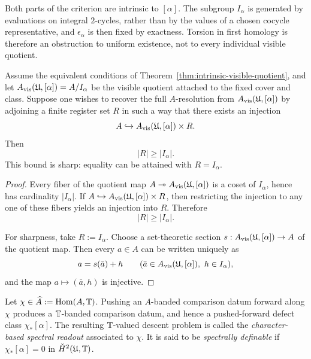 \begin{remark}\label{rem:cocycle-vs-pointwise}
Both parts of the criterion are intrinsic to $[\alpha]$.  The subgroup
$I_\alpha$ is generated by evaluations on integral $2$-cycles, rather than by
the values of a chosen cocycle representative, and
$\epsilon_\alpha$ is then fixed by exactness.  Torsion in first homology is
therefore an obstruction to uniform existence, not to every individual
visible quotient.
\end{remark}

\begin{lemma}
\label{thm:prefix-site-register-lower-bound}
Assume the equivalent conditions of
Theorem~\ref{thm:intrinsic-visible-quotient}, and let
$A_{\mathrm{vis}}(\mathfrak{U},[\alpha])=A/I_\alpha$ be the visible quotient attached to the fixed cover and
class.  Suppose one wishes to recover
the full $A$-resolution from $A_{\mathrm{vis}}(\mathfrak{U},[\alpha])$ by adjoining a finite register set $R$ in
such a way that there exists an injection
\[
A\hookrightarrow A_{\mathrm{vis}}(\mathfrak{U},[\alpha])\times R.
\]
Then
\[
\lvert R\rvert \ge \lvert I_\alpha\rvert.
\]
This bound is sharp: equality can be attained with $R=I_\alpha$.
\end{lemma}

\begin{proof}
Every fiber of the quotient map $A\twoheadrightarrow A_{\mathrm{vis}}(\mathfrak{U},[\alpha])$ is a coset of
$I_\alpha$, hence has cardinality $\lvert I_\alpha\rvert$.  If
$A\hookrightarrow A_{\mathrm{vis}}(\mathfrak{U},[\alpha])\times R$, then restricting the injection to any one of
these fibers yields an injection into $R$.  Therefore
\[
\lvert R\rvert\ge \lvert I_\alpha\rvert.
\]

For sharpness, take $R:=I_\alpha$.  Choose a set-theoretic section
$s:A_{\mathrm{vis}}(\mathfrak{U},[\alpha])\to A$ of the quotient map.  Then every $a\in A$ can be written
uniquely as
\[
a = s(\bar a)+h
\qquad
(\bar a\in A_{\mathrm{vis}}(\mathfrak{U},[\alpha]),\ h\in I_\alpha),
\]
and the map $a\mapsto (\bar a,h)$ is injective.
\end{proof}

\begin{definition}
\label{def:character-based-spectral-readout}
Let $\chi\in \widehat A:=\operatorname{Hom}(A,\mathbb{T})$.  Pushing an $A$-banded comparison datum
forward along $\chi$ produces a $\mathbb{T}$-banded comparison datum, and hence a
pushed-forward defect class $\chi_*[\alpha]$.  The resulting $\mathbb{T}$-valued
descent problem is called the \emph{character-based spectral readout}
associated to $\chi$.  It is said to be \emph{spectrally definable} if
$\chi_*[\alpha]=0$ in
$\check{H}^2(\mathfrak{U},\mathbb{T})$.
\end{definition}

